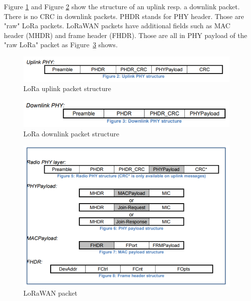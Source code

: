 Figure \ref{fig:uplink_struct} and Figure \ref{fig:downlink_struct} show the structure of an uplink resp. a 
downlink packet. There is no CRC in downlink packets. PHDR stands for PHY header.
Those are "raw" LoRa packets. LoRaWAN packets have additional fields such as MAC header (MHDR) and 
frame header (FHDR). Those are all in PHY payload of the "raw LoRa" packet as Figure~\ref{fig:lora_wan_struct} 
shows.   
\begin{figure}[h]
    \centering
    \includegraphics[width=1\textwidth]{figures/uplink_struct.png}
    \caption{LoRa uplink packet structure~\cite{lora_wan_spec}}
    \label{fig:uplink_struct}
\end{figure}

\begin{figure}[h]
    \centering
    \includegraphics[width=1\textwidth]{figures/downlink_struct.png}
    \caption{LoRa downlink packet structure~\cite{lora_wan_spec}}
    \label{fig:downlink_struct}
\end{figure}

\begin{figure}[h]
    \centering
    \includegraphics[width=1\textwidth]{figures/lorawan_struct.png}
    \caption{LoRaWAN packet~\cite{lora_wan_spec}}
    \label{fig:lora_wan_struct}
\end{figure}


